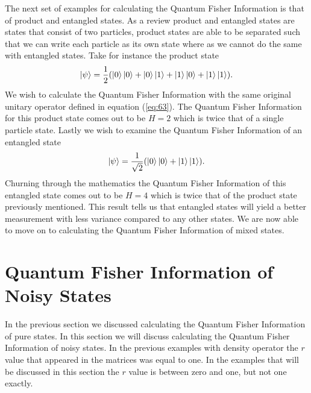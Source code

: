 \documentclass[twocolumn]{article}
\begin{document}
The next set of examples for calculating the Quantum Fisher Information is that of product and entangled states. As a review product and entangled states are states that consist of two particles, product states are able to be separated such that we can write each particle as its own state where as we cannot do the same with entangled states. Take for instance the product state 
\begin{equation} \label{eq:67}
\ket{\psi}=\frac{1}{2}(\ket{0}\ket{0}+\ket{0}\ket{1}+\ket{1}\ket{0}+\ket{1}\ket{1}).
\end{equation}
We wish to calculate the Quantum Fisher Information with the same original unitary operator defined in equation (\ref{eq:63}). The Quantum Fisher Information for this product state comes out to be $H=2$ which is twice that of a single particle state. Lastly we wish to examine the Quantum Fisher Information of an entangled state
\begin{equation} \label{eq:68}
\ket{\psi}=\frac{1}{\sqrt{2}}(\ket{0}\ket{0}+\ket{1}\ket{1}).
\end{equation}
Churning through the mathematics the Quantum Fisher Information of this entangled state comes out to be $H=4$ which is twice that of the product state previously mentioned. This result tells us that entangled states will yield a better measurement with less variance compared to any other states. We are now able to move on to calculating the Quantum Fisher Information of mixed states.
\section*{Quantum Fisher Information of Noisy States}
In the previous section we discussed calculating the Quantum Fisher Information of pure states. In this section we will discuss calculating the Quantum Fisher Information of noisy states. In the previous examples with density operator the $r$ value that appeared in the matrices was equal to one. In the examples that will be discussed in this section the $r$ value is between zero and one, but not one exactly.
\end{document}
